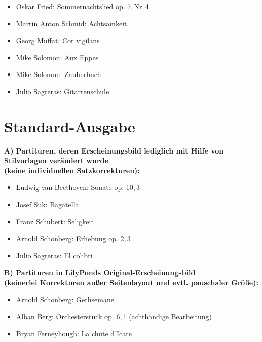 \documentclass[DIV=12]{scrreprt}
\begin{document}
\begin{itemize}
\item Oskar Fried: Sommernachtslied op. 7,\,Nr.\,4
\item Martin Anton Schmid: Achtsamkeit
\item Georg Muffat: Cor vigilans
\item Mike Solomon: Aux Eppes
\item Mike Solomon: Zauberbuch
\item Julio Sagreras: Gitarrenschule
\end{itemize}








\section*{Standard-Ausgabe}

\bigskip

\textbf{A) Partituren, deren Erscheinungsbild lediglich mit Hilfe von Stilvorlagen verändert wurde \\
(keine individuellen Satzkorrekturen):}

\begin{itemize}
\item Ludwig van Beethoven: Sonate op. 10,\,3
\item Josef Suk: Bagatella 
\item Franz Schubert: Seligkeit
\item Arnold Schönberg: Erhebung op. 2,\,3
\item Julio Sagreras: El colibri
\end{itemize}

\textbf{B) Partituren in LilyPonds Original-Erscheinungsbild \\
(keinerlei Korrekturen außer Seitenlayout und evtl. pauschaler Größe):}

\begin{itemize}
\item Arnold Schönberg: Gethsemane
\item Alban Berg: Orchesterstück op. 6,\,1 (achthändige Bearbeitung)
\item Bryan Ferneyhough: La chute d'Icare
\end{itemize}









\end{document}

